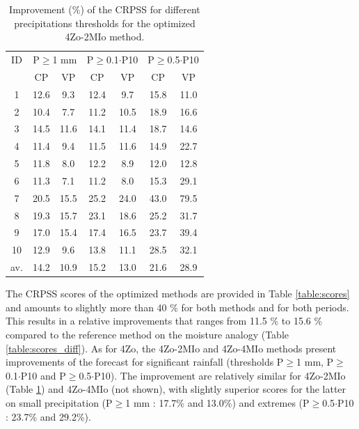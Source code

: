 \documentclass[5p]{elsarticle}
\begin{document}
\begin{table}[htb]
	\caption{Improvement (\%) of the CRPSS for different precipitations thresholds for the optimized 4Zo-2MIo method.}
	\footnotesize
	\begin{center}
		\begin{tabular}{ccccccc}
			\hline 
			ID & \multicolumn{2}{c}{P\(\geq\)1 mm} & \multicolumn{2}{c}{P\(\geq\)0.1\(\cdot\)P10} & \multicolumn{2}{c}{P\(\geq\)0.5\(\cdot\)P10} \\  
			& CP & VP & CP & VP & CP & VP \\ 
			\hline 
			1 & 12.6 & 9.3 & 12.4 & 9.7 & 15.8 & 11.0 \\
			2 & 10.4 & 7.7 & 11.2 & 10.5 & 18.9 & 16.6 \\ 
			3 & 14.5 & 11.6 & 14.1 & 11.4 & 18.7 & 14.6 \\ 
			4 & 11.4 & 9.4 & 11.5 & 11.6 & 14.9 & 22.7 \\ 
			5 & 11.8 & 8.0 & 12.2 & 8.9 & 12.0 & 12.8 \\ 
			6 & 11.3 & 7.1 & 11.2 & 8.0 & 15.3 & 29.1 \\ 
			7 & 20.5 & 15.5 & 25.2 & 24.0 & 43.0 & 79.5 \\
			8 & 19.3 & 15.7 & 23.1 & 18.6 & 25.2 & 31.7 \\ 
			9 & 17.0 & 15.4 & 17.4 & 16.5 & 23.7 & 39.4 \\ 
			10 & 12.9 & 9.6 & 13.8 & 11.1 & 28.5 & 32.1 \\ 
			\hline 
			av. & 14.2 & 10.9 & 15.2 & 13.0 & 21.6 & 28.9 \\ 
			\hline 
		\end{tabular} 
	\end{center}
	\label{table:scores_thresholds_4Zo-2MIo}
\end{table}

The CRPSS scores of the optimized methods are provided in Table \ref{table:scores} and amounts to slightly more than 40 \% for both methods and for both periods. This results in a relative improvements that ranges from 11.5 \% to 15.6 \% compared to the reference method on the moisture analogy (Table \ref{table:scores_diff}). As for 4Zo, the 4Zo-2MIo and 4Zo-4MIo methods present improvements of the forecast for significant rainfall (thresholds P\(\geq\)1 mm, P\(\geq\)0.1\(\cdot\)P10 and P\(\geq\)0.5\(\cdot\)P10). The improvement are relatively similar for 4Zo-2MIo (Table \ref{table:scores_thresholds_4Zo-2MIo}) and 4Zo-4MIo (not shown), with slightly superior scores for the latter on small precipitation (P\(\geq\)1 mm : 17.7\% and 13.0\%) and extremes (P\(\geq\)0.5\(\cdot\)P10 : 23.7\% and 29.2\%).
\end{document}
